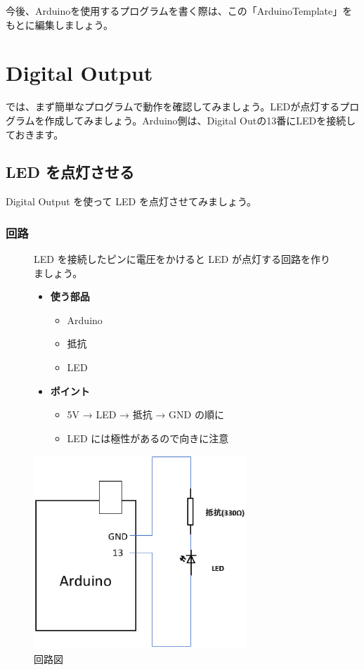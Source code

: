 \documentclass[11pt,a4paper]{jarticle}
\begin{document}
今後、Arduinoを使用するプログラムを書く際は、この「ArduinoTemplate」をもとに編集しましょう。


\newpage

\section{Digital Output}
では、まず簡単なプログラムで動作を確認してみましょう。LEDが点灯するプログラムを作成してみましょう。Arduino側は、Digital Outの13番にLEDを接続しておきます。

\subsection{LED を点灯させる}
Digital Output を使って LED を点灯させてみましょう。

\subsubsection*{回路}
\begin{figure}[h!]
 \begin{minipage}{0.5\columnwidth}
  LED を接続したピンに電圧をかけると LED が点灯する回路を作りましょう。
  \begin{itemize}
   \item \textbf{使う部品}
	 \begin{itemize}
	  \item Arduino
	  \item 抵抗
	  \item LED
	 \end{itemize}
   \item \textbf{ポイント}
	 \begin{itemize}
	  \item 5V → LED → 抵抗 → GND の順に
	  \item LED には極性があるので向きに注意
	 \end{itemize}
  \end{itemize}
 \end{minipage}
 \begin{minipage}{0.5\columnwidth}
  \centering
  \includegraphics[width=80mm]{img/eps/kairo2.eps}
  \caption{回路図}
 \end{minipage}
\end{figure}
\end{document}
